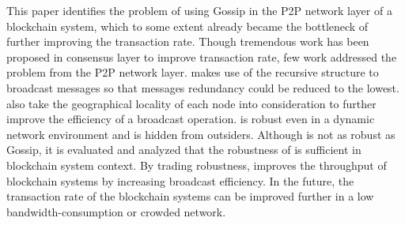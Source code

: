 This paper identifies the problem of using Gossip in the P2P network layer of a blockchain system, which to some extent already became the bottleneck of further improving the transaction rate. Though tremendous work has been proposed in consensus layer to improve transaction rate, few work addressed the problem from the P2P network layer. \xxx makes use of the recursive structure to broadcast messages so that messages redundancy could be reduced to the lowest. \xxx also take the geographical locality of each node into consideration to further improve the efficiency of a broadcast operation. \xxx is robust even in a dynamic network environment and is hidden from outsiders. Although \xxx is not as robust as Gossip, it is evaluated and analyzed that the robustness of \xxx is sufficient in blockchain system context. By trading robustness, \xxx improves the throughput of blockchain systems by increasing broadcast efficiency. In the future, the transaction rate of the blockchain systems can be improved further in a low bandwidth-consumption or crowded network.